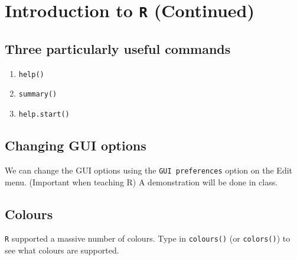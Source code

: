 \documentclass[a4paper,12pt]{article}
\begin{document}

\section{Introduction to \texttt{R} (Continued) }

\subsection{Three particularly useful commands}
\begin{enumerate}
\item \texttt{help()}
\item \texttt {summary()}
\item \texttt{help.start()}
\end{enumerate}
\subsection{Changing GUI options}
We can change the GUI options using the \texttt{GUI preferences} option on the Edit menu. (Important when teaching R)
A demonstration will be done in class.
\subsection{Colours}
\texttt{R} supported a massive number of colours. Type in \texttt{colours()} (or \texttt{colors()}) to see what colours are supported.
\end{document}
